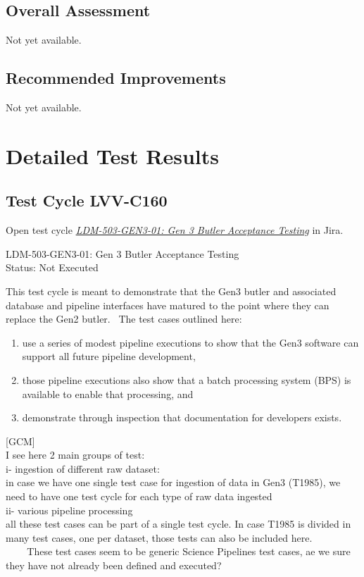 \documentclass[DM,lsstdraft,STR,toc]{lsstdoc}
\providecommand{\tightlist}{
  \setlength{\itemsep}{0pt}\setlength{\parskip}{0pt}}
\begin{document}
\subsection{Overall Assessment}
\label{sect:overallassessment}

Not yet available.

\subsection{Recommended Improvements}
\label{sect:recommendations}

Not yet available.

\newpage
\section{Detailed Test Results}
\label{sect:detailedtestresults}

\subsection{Test Cycle LVV-C160 }

Open test cycle {\it \href{https://jira.lsstcorp.org/secure/Tests.jspa#/testrun/LVV-C160}{LDM-503-GEN3-01: Gen 3 Butler Acceptance Testing}} in Jira.

LDM-503-GEN3-01: Gen 3 Butler Acceptance Testing\\
Status: Not Executed

This test cycle is meant to demonstrate that the Gen3 butler and
associated database and pipeline interfaces have matured to the point
where they can replace the Gen2 butler. ~The test cases outlined here:

\begin{enumerate}
\tightlist
\item
  use a series of modest pipeline executions to show that the Gen3
  software can support all future pipeline development, ~
\item
  those pipeline executions also show that a batch processing system
  (BPS) is available to enable that processing, and
\item
  demonstrate through inspection that documentation for developers
  exists.
\end{enumerate}

{[}GCM{]}\\
I see here 2 main groups of test:\\
i- ingestion of different raw dataset:\\
in case we have one single test case for ingestion of data in Gen3
(T1985), we need to have one test cycle for each type of raw data
ingested\\
ii- various pipeline processing\\
all these test cases can be part of a single test cycle. In case T1985
is divided in many test cases, one per dataset, those tests can also be
included here.\\
\hspace*{0.333em} ~ ~ ~These test cases seem to be generic Science
Pipelines test cases, ae we sure they have not already been defined and
executed?
\end{document}
